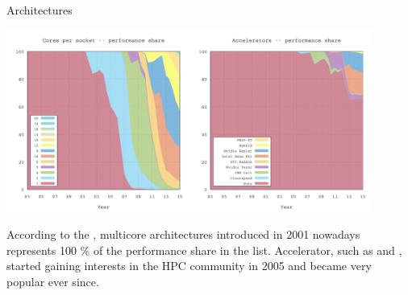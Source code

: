 \begin{frame}{Architectures}

  \begin{center}
    \includegraphics[width=0.9\textwidth]{data/top500}
  \end{center}

  According to the , multicore
  architectures introduced in 2001 nowadays represents 100 \% of
  the performance share in the list. Accelerator, such as 
  and , started gaining interests in the HPC
  community in 2005 and became very popular ever since.

\end{frame}

